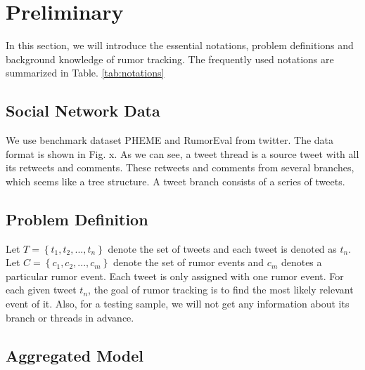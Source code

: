 \section{Preliminary}
\label{sec:perliminary}

In this section, we will introduce the essential notations, problem definitions and background knowledge of rumor tracking. The frequently used notations are summarized in Table. \ref{tab:notations}

\begin{table}[tbp]
	\caption{Notation Summarization}
	\centering
	\label{tab:notations}
\end{table}

\subsection{Social Network Data}
We use benchmark dataset PHEME \cite{DBLP:conf/coling/KochkinaLZ18} and RumorEval\cite{DBLP:conf/semeval/EnayetE17} from twitter. The data format is shown in Fig. x. As we can see, a tweet thread is a source tweet with all its retweets and comments. These retweets and comments from several branches, which seems like a tree structure. A tweet branch consists of a series of tweets.

\subsection{Problem Definition}
\label{sec:problem}
Let $T = \left\{t_1, t_2, ..., t_n \right\}$ denote the set of tweets and each tweet is denoted as $t_n$. Let $C = \left\{c_1, c_2, ... , c_m \right\}$ denote the set of rumor events and $c_m$ denotes a particular rumor event. Each tweet is only assigned with one rumor event. For each given tweet $t_n$, the goal of rumor tracking is to find the most likely relevant event of it. Also, for a testing sample, we will not get any information about its branch or threads in advance. 

\subsection{Aggregated Model}
